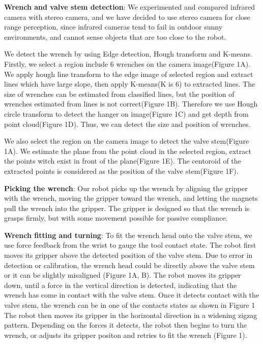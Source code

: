 \documentclass{standalone}
\begin{document}
\textbf{Wrench and valve stem detection}: We experimented and compared infrared camera with stereo camera, and we have decided to use stereo camera for close range perception, since infrared cameras tend to fail in outdoor sunny environments, and cannot sense objects that are too close to the robot. 

We detect the wrench by using Edge detection, Hough transform and K-means. Firstly, we select a region include 6 wrenches on the camera image(Figure 1A). We apply hough line transform to the edge image of selected region and extract lines which have large slope, then apply K-means(K is 6) to extracted lines. The size of wrenches can be estimated from classified lines, but the position of wrenches estimated from lines is not correct(Figure 1B). Therefore we use Hough circle transform to detect the hanger on image(Figure 1C) and get depth from point cloud(Figure 1D). Thus, we can detect the size and position of wrenches.  

We also select the region on the camera image to detect the valve stem(Figure 1A). We estimate the plane from the point cloud in the selected region, extract the points witch exist in front of the plane(Figure 1E). The centoroid of the extracted points is considered as the position of the valve stem(Figure 1F).

\textbf{Picking the wrench}: Our robot picks up the wrench by aligning the gripper with the wrench, moving the gripper toward the wrench, and letting the magnets pull the wrench into the gripper. The gripper is designed so that the wrench is grasps firmly, but with some movement possible for passive compliance.

\textbf{Wrench fitting and turning}: To fit the wrench head onto the valve stem, we use force feedback from the wrist to gauge the tool contact state. The robot first moves its gripper above the detected position of the valve stem. Due to error in detection or calibration, the wrench head could be directly above the valve stem or it can be slightly misaligned (Figure 1A, B). The robot moves its gripper down, until a force in the vertical direction is detected, indicating that the wrench has come in contact with the valve stem. Once it detects contact with the valve stem, the wrench can be in one of the contacts states as shown in Figure 1 The robot then moves its gripper in the horizontal direction in a widening zigzag pattern. Depending on the forces it detects, the robot then begins to turn the wrench, or adjusts its gripper positon and retries to fit the wrench (Figure 1).
\end{document}
